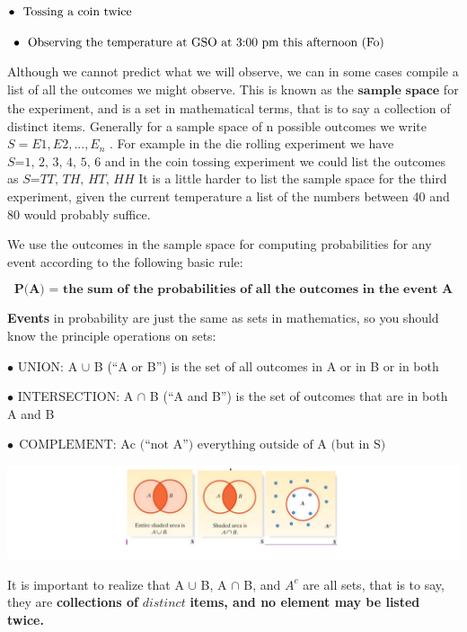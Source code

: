 \documentclass[
]{book}
\begin{document}
\(\bullet \ \ \text{Tossing a coin twice} \\ \\\)

\(\bullet \ \ \text{Observing the temperature at GSO at 3:00 pm this afternoon (Fo)} \\\)

Although we cannot predict what we will observe, we can in some cases compile a list of all the outcomes we might observe. This is known as the \(\underline{\textbf{sample space}}\) for the experiment, and is a set in mathematical terms, that is to say a collection of distinct items. Generally for a sample space of n possible outcomes we write \(S = {E1, E2, ... , E_n}\) . For example in the die rolling experiment we have \(\textit{S={1, 2, 3, 4, 5, 6}}\) and in the coin tossing experiment we could list the outcomes as \(\textit{S={TT, TH, HT, HH}}\) It is a little harder to list the sample space for the third experiment, given the current temperature a list of the numbers between 40 and 80 would probably suffice.

We use the outcomes in the sample space for computing probabilities for any event according to the following basic rule:

\[
\textbf{P(A) = the sum of the probabilities of all the outcomes in the event A}
\]

\textbf{Events} in probability are just the same as sets in mathematics, so you should know the principle operations on sets:

\(\bullet\) UNION: A \(\cup\) B (``A or B'') is the set of all outcomes in A or in B or in both

\(\bullet\) INTERSECTION: A \(\cap\) B (``A and B'') is the set of outcomes that are in both A and B

\(\bullet\ \ \text{COMPLEMENT: Ac (“not A”) everything outside of A (but in S)}\)

\includegraphics[width=7.5625in,height=\textheight]{images/img13.png}

It is important to realize that A \(\cup\) B, A \(\cap\) B, and \(A^c\) are all sets, that is to say, they are \textbf{collections of} \(\textit{distinct}\) \textbf{items, and no element may be listed twice.}
\end{document}

